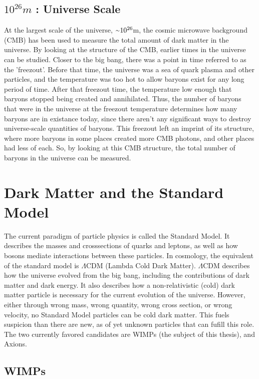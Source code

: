 \subsection{$10^{26}m$ : Universe Scale}
%
At the largest scale of the universe, $\nicetilde 10^{26}$m, the cosmic microwave background (CMB) has been used to measure the total amount of dark matter in the universe.
By looking at the structure of the CMB, earlier times in the universe can be studied.
Closer to the big bang, there was a point in time referred to as the 'freezout'.
Before that time, the universe was a sea of quark plasma and other particles, and the temperature was too hot to allow baryons exist for any long period of time.
After that freezout time, the temperature low enough that baryons stopped being created and annihilated.
Thus, the number of baryons that were in the universe at the freezout temperature determines how many baryons are in existance today, since there aren't any significant ways to destroy universe-scale quantities of baryons.
This freezout left an imprint of its structure, where more baryons in some places created more CMB photons, and other places had less of each.
So, by looking at this CMB structure, the total number of baryons in the universe can be measured.




\section{Dark Matter and the Standard Model}

The current paradigm of particle physics is called the Standard Model.
It describes the masses and crosssections of quarks and leptons, as well as how bosons mediate interactions between these particles.
In cosmology, the equivalent of the standard model is $\Lambda$CDM (Lambda Cold Dark Matter). 
$\Lambda$CDM describes how the universe evolved from the big bang, including the contributions of dark matter and dark energy.
It also describes how a non-relativistic (cold) dark matter particle is necessary for the current evolution of the universe.
However, either through wrong mass, wrong quantity, wrong cross section, or wrong velocity, no Standard Model particles can be cold dark matter.
This fuels suspicion than there are new, as of yet unknown particles that can fufill this role.
The two currently favored candidates are WIMPs (the subject of this thesis), and Axions.


\subsection{WIMPs}

